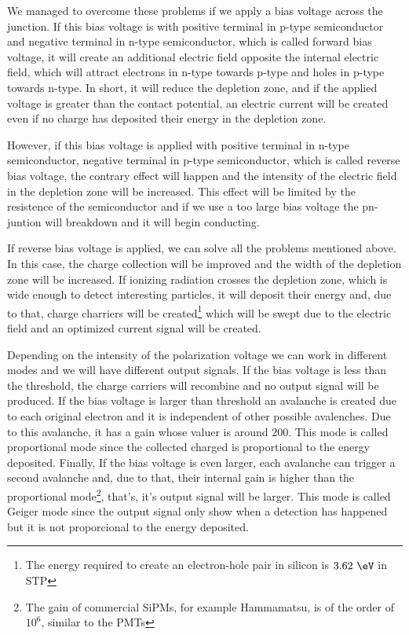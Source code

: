 We managed to overcome these problems if we apply a bias voltage across the junction. If this bias voltage is with positive terminal in p-type semiconductor and negative terminal in n-type semiconductor, which is called forward bias voltage, it will create an additional electric field opposite the internal electric field, which will attract electrons in n-type towards p-type and holes in p-type towards n-type. In short, it will reduce the depletion zone, and if the applied voltage is greater than the contact potential, an electric current will be created even if no charge has deposited their energy in the depletion zone.

However, if this bias voltage is applied with positive terminal in n-type semiconductor, negative terminal in p-type semiconductor, which is called reverse bias voltage, the contrary effect will happen and the intensity of the electric field in the depletion zone will be increased. This effect will be limited by the resistence of the semiconductor and if we use a too large bias voltage the pn-juntion will breakdown and it will begin conducting. 

If reverse bias voltage is applied, we can solve all the problems mentioned above. In this case, the charge collection will be improved and the width of the depletion zone will be increased. If ionizing radiation crosses the depletion zone, which is wide enough to detect interesting particles, it will deposit their energy and, due to that, charge charriers will be created\footnote{The energy required to create an electron-hole pair in silicon is $3.62~\eV$ in STP\cite{Leo}} which will be swept due to the electric field and an optimized current signal will be created. 

Depending on the intensity of the polarization voltage we can work in different modes and we will have different output signals. If the bias voltage is less than the threshold, the charge carriers will recombine and no output signal will be produced. If the bias voltage is larger than threshold an avalanche is created due to each original electron and it is independent of other possible avalenches. Due to this avalanche, it has a gain whose valuer is around $200$. This mode is called proportional mode since the collected charged is proportional to the energy deposited. Finally, If the bias voltage is even larger, each avalanche can trigger a second avalanche and, due to that, their internal gain is higher than the proportional mode\footnote{The gain of commercial SiPMs, for example Hammamatsu, is of the order of $10^6$, similar to the PMTs}, that's, it's output signal will be larger. This mode is called Geiger mode since the output signal only show when a detection has happened but it is not proporcional to the energy deposited. 

